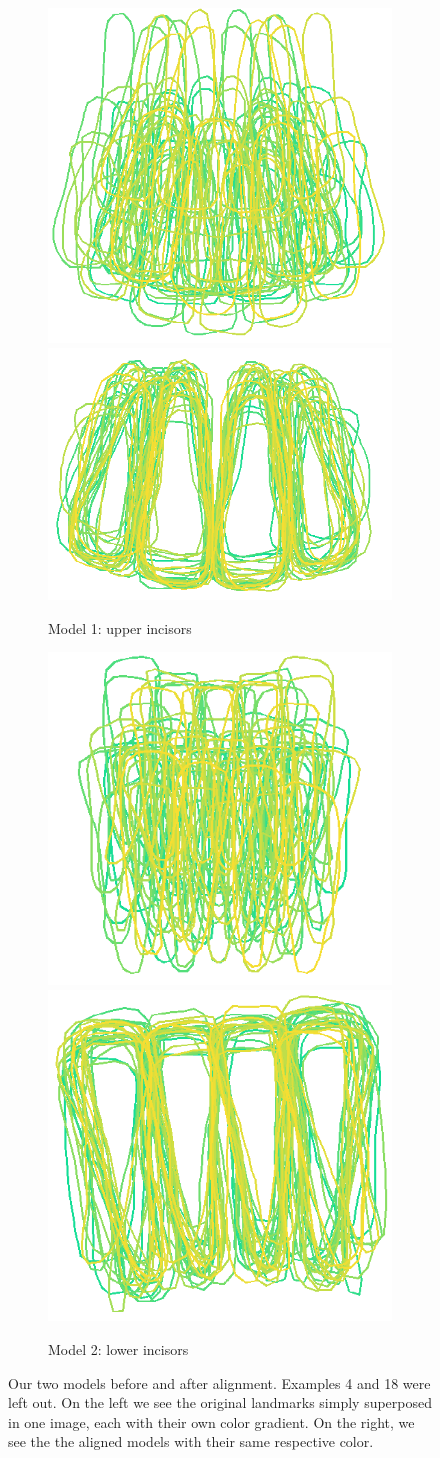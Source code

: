 \documentclass[a4paper,titlepage,12pt]{article}
\begin{document}
\begin{figure}
	\centering
	\begin{subfigure}{\linewidth}
		\centering
		\includegraphics[width=0.4\linewidth]{shape/upper_init}
		\includegraphics[width=0.4\linewidth]{shape/upper_aligned}
		\caption{Model 1: upper incisors}
	\end{subfigure}
	\begin{subfigure}{\linewidth}
		\centering
		\includegraphics[width=0.4\linewidth]{shape/lower_init}
		\includegraphics[width=0.4\linewidth]{shape/lower_aligned}
		\caption{Model 2: lower incisors}
	\end{subfigure}
	\caption{Our two models before and after alignment. Examples 4 and 18 were left out. On the left we see the original landmarks simply superposed in one image, each with their own color gradient. On the right, we see the the aligned models with their same respective color. }
	\label{fig:align}
\end{figure}
\end{document}
